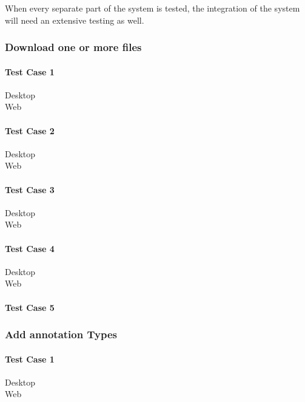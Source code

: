 When every separate part of the system is tested, the integration of the system will need an extensive testing as well.

\subsubsection{Download one or more files}
\paragraph*{Test Case 1}
\begin{description}
 \item[Desktop]
 \item[Web]
\end{description}
\paragraph*{Test Case 2}
\begin{description}
 \item[Desktop]
 \item[Web]
\end{description}
\paragraph*{Test Case 3}
\begin{description}
 \item[Desktop]
 \item[Web]
\end{description}
\paragraph*{Test Case 4}
\begin{description}
 \item[Desktop]
 \item[Web]
\end{description}
\paragraph*{Test Case 5}
\subsubsection{Add annotation Types}
\paragraph*{Test Case 1}
\begin{description}
 \item[Desktop]
 \item[Web]
\end{description}
